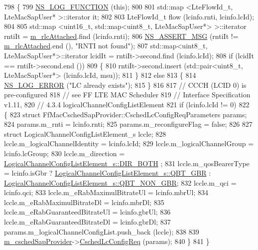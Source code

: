 \begin{DoxyCode}
798 \{
799   \hyperlink{log-macros-disabled_8h_a90b90d5bad1f39cb1b64923ea94c0761}{NS\_LOG\_FUNCTION} (\textcolor{keyword}{this});
800 
801   std::map <LteFlowId\_t, LteMacSapUser* >::iterator it;
802   
803   LteFlowId\_t flow (lcinfo.rnti, lcinfo.lcId);
804   
805   std::map <uint16\_t, std::map<uint8\_t, LteMacSapUser*> >::iterator rntiIt = 
      \hyperlink{classns3_1_1LteEnbMac_a5de3f3cae1cbc8438a7fdc5cd173a821}{m\_rlcAttached}.find (lcinfo.rnti);
806   \hyperlink{assert_8h_aff5ece9066c74e681e74999856f08539}{NS\_ASSERT\_MSG} (rntiIt != \hyperlink{classns3_1_1LteEnbMac_a5de3f3cae1cbc8438a7fdc5cd173a821}{m\_rlcAttached}.end (), \textcolor{stringliteral}{"RNTI not found"});
807   std::map<uint8\_t, LteMacSapUser*>::iterator lcidIt = rntiIt->second.find (lcinfo.lcId);
808   \textcolor{keywordflow}{if} (lcidIt == rntiIt->second.end ())
809     \{
810       rntiIt->second.insert (std::pair<uint8\_t, LteMacSapUser*> (lcinfo.lcId, msu));
811     \}
812   \textcolor{keywordflow}{else}
813     \{
814       \hyperlink{group__logging_ga0261a8db1d4ac5f79417d117634fd455}{NS\_LOG\_ERROR} (\textcolor{stringliteral}{"LC already exists"});
815     \}
816 
817   \textcolor{comment}{// CCCH (LCID 0) is pre-configured }
818   \textcolor{comment}{// see FF LTE MAC Scheduler}
819   \textcolor{comment}{// Interface Specification v1.11, }
820   \textcolor{comment}{// 4.3.4 logicalChannelConfigListElement}
821   \textcolor{keywordflow}{if} (lcinfo.lcId != 0)
822     \{
823       \textcolor{keyword}{struct }FfMacCschedSapProvider::CschedLcConfigReqParameters params;
824       params.m\_rnti = lcinfo.rnti;
825       params.m\_reconfigureFlag = \textcolor{keyword}{false};
826 
827       \textcolor{keyword}{struct }LogicalChannelConfigListElement\_s lccle;
828       lccle.m\_logicalChannelIdentity = lcinfo.lcId;
829       lccle.m\_logicalChannelGroup = lcinfo.lcGroup;
830       lccle.m\_direction = \hyperlink{structns3_1_1LogicalChannelConfigListElement__s_a0ce1e3a6af4d9a3e9fc19361d0af4e00abbf65338c16bef65cdedec87e8a7efaa}{LogicalChannelConfigListElement\_s::DIR\_BOTH}
      ;
831       lccle.m\_qosBearerType = lcinfo.isGbr ? 
      \hyperlink{structns3_1_1LogicalChannelConfigListElement__s_a4b3d593978adeb6b101b9492d89aad3ea269c9a9e27278c110e664e9aa989bcf7}{LogicalChannelConfigListElement\_s::QBT\_GBR} : 
      \hyperlink{structns3_1_1LogicalChannelConfigListElement__s_a4b3d593978adeb6b101b9492d89aad3eac20f0fbd558d34362f2e8c314723a55f}{LogicalChannelConfigListElement\_s::QBT\_NON\_GBR};
832       lccle.m\_qci = lcinfo.qci;
833       lccle.m\_eRabMaximulBitrateUl = lcinfo.mbrUl;
834       lccle.m\_eRabMaximulBitrateDl = lcinfo.mbrDl;
835       lccle.m\_eRabGuaranteedBitrateUl = lcinfo.gbrUl;
836       lccle.m\_eRabGuaranteedBitrateDl = lcinfo.gbrDl;
837       params.m\_logicalChannelConfigList.push\_back (lccle);
838 
839       \hyperlink{classns3_1_1LteEnbMac_a0d1bd5af32f8b78f2c8ff493560d3fca}{m\_cschedSapProvider}->\hyperlink{classns3_1_1FfMacCschedSapProvider_ad80e0e37f90887055ac79ccad7d2ba2f}{CschedLcConfigReq} (params);
840     \}
841 \}
\end{DoxyCode}


